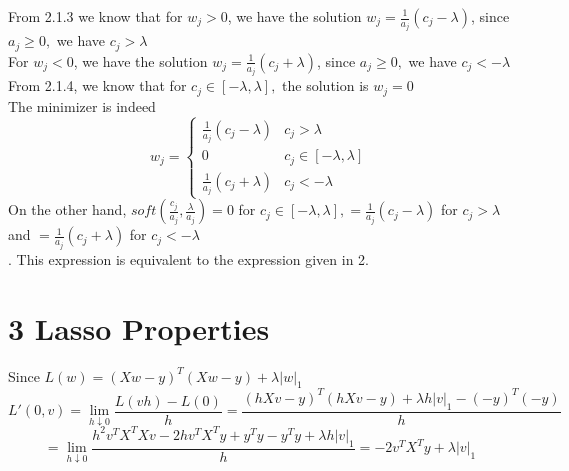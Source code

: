 \documentclass{article}
\newenvironment{problem}[2][$\bullet$]{\begin{trivlist}\large
		\item[\hskip \labelsep {\bfseries #1}\hskip \labelsep {\bfseries #2.}]}  {\end{trivlist}}
\newenvironment{sub}[2][$-$]{\begin{trivlist}
		\item[\hskip \labelsep {\bfseries #1}\hskip \labelsep {\bfseries #2.}]}  {\end{trivlist}}
\begin{document}
\begin{sub}{2.1.5}
\end{sub}
From 2.1.3 we know that for $w_j > 0$, we have the solution $w_j = \frac{1}{a_j} (c_j - \lambda)$, since $a_j  \geq 0,$ we have $c_j > \lambda $\\For $w_j < 0$, we have the solution $w_j = \frac{1}{a_j} (c_j + \lambda)$, since $a_j  \geq 0,$ we have $c_j <  -\lambda $\\
From 2.1.4,  we know that for $c_j \in [-\lambda, \lambda],$ the solution is $w_j = 0$\\
The minimizer is indeed 
\[
w_{j}=\begin{cases}
\frac{1}{a_{j}}\left(c_{j}-\lambda\right) & c_{j}>\lambda\\
0 & c_{j}\in[-\lambda,\lambda]\\
\frac{1}{a_{j}}\left(c_{j}+\lambda\right) & c_{j}<-\lambda
\end{cases}
\]
On the other hand, $soft(\frac{c_j}{a_j},\frac{\lambda}{a_j}) = 0$ for $c_{j}\in[-\lambda,\lambda]  , = \frac{1}{a_{j}}\left(c_{j}-\lambda\right)$ for $c_{j}>\lambda$ and $ = \frac{1}{a_{j}}\left(c_{j}+\lambda\right) $ for $ c_{j}<-\lambda$\\ . This expression is equivalent to the expression given in 2.\\

\section{3 Lasso Properties}

\begin{problem}{3.1 Deriving $\lambda_{max}$}
\end{problem}
\begin{sub}{3.1.1}
\end{sub}
Since $L(w) = (Xw - y)^T(Xw-y) +\lambda |w|_1$\\
$$L'(0,v)  = \lim\limits_{h \downarrow0 } \frac{L(vh) - L(0)}{h} = \frac{(hXv - y)^T(hXv  -y) + \lambda h |v|_1 - (-y)^T(-y)}{h}$$$$ =\lim\limits_{h \downarrow0 } \frac{h^2v^TX^TXv - 2hv^TX^Ty + y^Ty - y^Ty + \lambda h|v|_1}{h} = -2v^TX^Ty + \lambda |v|_1$$
\end{document}
